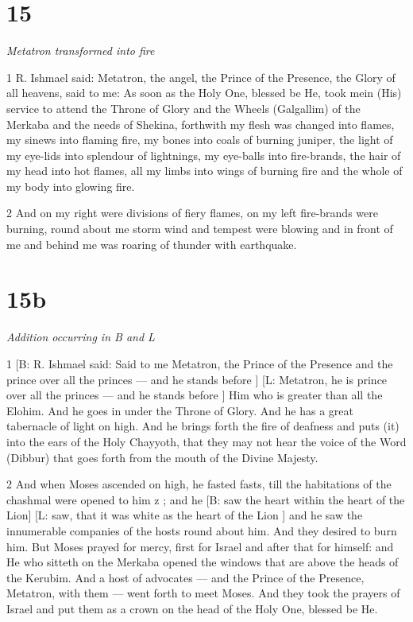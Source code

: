\chapter{15}

\par \textit{Metatron transformed into fire}

\par 1 R. Ishmael said: Metatron, the angel, the Prince of the Presence, the Glory of all heavens, said to me: As soon as the Holy One, blessed be He, took mein (His) service to attend the Throne of Glory and the Wheels (Galgallim) of the Merkaba and the needs of Shekina, forthwith my flesh was changed into flames, my sinews into flaming fire, my bones into coals of burning juniper, the light of my eye-lids into splendour of lightnings, my eye-balls into fire-brands, the hair of my head into hot flames, all my limbs into wings of burning fire and the whole of my body into glowing fire. 

\par 2 And on my right were divisions of fiery flames, on my left fire-brands were burning, round about me storm wind and tempest were blowing and in front of me and behind me was roaring of thunder with earthquake.

\chapter{15b}

\par \textit{Addition occurring in B and L}

\par 1 [B: R. Ishmael said: Said to me Metatron, the Prince of the Presence and the prince over all the princes — and he stands before ] [L: Metatron, he is prince over all the princes — and he stands before ] Him who is greater than all the Elohim. And he goes in under the Throne of Glory. And he has a great tabernacle of light on high. And he brings forth the fire of deafness and puts (it) into the ears of the Holy Chayyoth, that they may not hear the voice of the Word (Dibbur) that goes forth from the mouth of the Divine Majesty. 

\par 2 And when Moses ascended on high, he fasted fasts, till the habitations of the chashmal were opened to him z ; and he [B: saw the heart within the heart of the Lion] [L:  saw, that it was white as the  heart of the Lion ] and he saw the innumerable companies of the hosts round about him. And they desired to burn him. But Moses prayed for mercy, first for Israel and after that for himself: and He who sitteth on the Merkaba opened the windows that are above the heads of the Kerubim. And a host of advocates — and the Prince of the Presence, Metatron, with them — went forth to meet Moses. And they took the prayers of Israel and put them as a crown on the head of the Holy One, blessed be He. 

